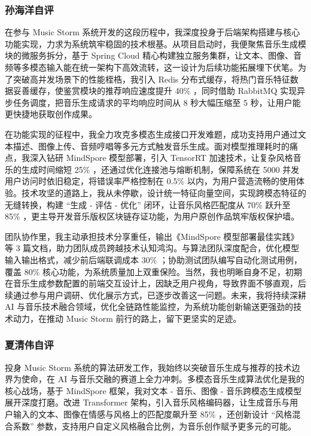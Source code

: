 \documentclass{base}
\numberwithin{figure}{section} %
\begin{document}
\subsubsection{孙海洋自评}

在参与 Music Storm 系统开发的这段历程中，我深度投身于后端架构搭建与核心功能实现，力求为系统筑牢稳固的技术根基。从项目启动时，我便聚焦音乐生成模块的微服务拆分，基于 Spring Cloud 精心构建独立服务集群，让文本、图像、音频等多模态输入能在统一架构下高效流转，这一设计为后续功能拓展埋下伏笔。为了突破高并发场景下的性能桎梏，我引入 Redis 分布式缓存，将热门音乐特征数据妥善缓存，使鉴赏模块的推荐响应速度提升 40\% ，同时借助 RabbitMQ 实现异步任务调度，把音乐生成请求的平均响应时间从 8 秒大幅压缩至 5 秒，让用户能更快捷地获取创作成果。

在功能实现的征程中，我全力攻克多模态生成接口开发难题，成功支持用户通过文本描述、图像上传、音频哼唱等多元方式触发音乐生成。面对模型推理耗时的痛点，我深入钻研 MindSpore 模型部署，引入 TensorRT 加速技术，让复杂风格音乐的生成时间缩短 25\% ，还通过优化连接池与熔断机制，保障系统在 5000 并发用户访问时依旧稳定，将错误率严格控制在 0.5\% 以内，为用户营造流畅的使用体验。技术攻坚的道路上，我从未停歇，设计统一特征向量空间，实现跨模态特征的无缝转换，构建 “生成 - 评估 - 优化” 闭环，让音乐风格匹配度从 70\% 跃升至 85\% ，更主导开发音乐版权区块链存证功能，为用户原创作品筑牢版权保护墙。

团队协作里，我主动承担技术分享重任，输出《MindSpore 模型部署最佳实践》等 3 篇文档，助力团队成员跨越技术认知鸿沟。与算法团队深度配合，优化模型输入输出格式，减少前后端联调成本 30\% ；协助测试团队编写自动化测试用例，覆盖 80\% 核心功能，为系统质量加上双重保险。当然，我也明晰自身不足，初期在音乐生成参数配置的前端交互设计上，因缺乏用户视角，导致界面不够直观，后续通过参与用户调研、优化展示方式，已逐步改善这一问题。未来，我将持续深耕 AI 与音乐技术融合领域，优化全链路性能监控，为系统功能创新输送更强劲的技术动力，在推动 Music Storm 前行的路上，留下更坚实的足迹。

\subsubsection{夏清伟自评}

投身 Music Storm 系统的算法研发工作，我始终以突破音乐生成与推荐的技术边界为使命，在 AI 与音乐交融的赛道上全力冲刺。多模态音乐生成算法优化是我的核心战场，基于 MindSpore 框架，我对文本 - 音乐、图像 - 音乐跨模态生成模型展开深度打磨。改进 Transformer 架构，引入音乐风格编码器，让生成音乐与用户输入的文本、图像在情感与风格上的匹配度飙升至 85\% ，还创新设计 “风格混合系数” 参数，支持用户自定义风格融合比例，为音乐创作赋予更多元的可能。
\end{document}
